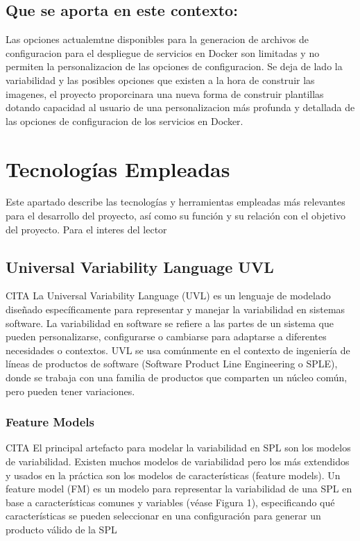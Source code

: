 \documentclass[12pt, a4paper, twoside]{article}
\begin{document}
\subsection{Que se aporta en este contexto:}
Las opciones actualemtne disponibles para la generacion de archivos de configuracion para el despliegue de servicios en Docker son limitadas y no permiten la personalizacion de las opciones de configuracion.
Se deja de lado la variabilidad y las posibles opciones que existen a la hora de construir las imagenes, el proyecto proporcinara una nueva forma de construir plantillas dotando capacidad al usuario de una personalizacion
más profunda y detallada de las opciones de configuracion de los servicios en Docker.
















\section{Tecnologías Empleadas}
Este apartado describe las tecnologías y herramientas empleadas más relevantes para el desarrollo del proyecto, así como su función y su relación con el objetivo del proyecto.
Para el interes del lector 

\subsection{Universal Variability Language UVL}
CITA 
La Universal Variability Language (UVL) es un lenguaje de modelado diseñado específicamente para representar y manejar la variabilidad en sistemas software. 
La variabilidad en software se refiere a las partes de un sistema que pueden personalizarse, configurarse o cambiarse para adaptarse a diferentes necesidades o contextos. 
UVL se usa comúnmente en el contexto de ingeniería de líneas de productos de software (Software Product Line Engineering o SPLE), donde se trabaja con una familia de productos que comparten un núcleo común, pero pueden tener variaciones.

\subsubsection{Feature Models}
CITA 
El principal artefacto para modelar la variabilidad en SPL son los modelos de variabilidad. Existen muchos modelos 
de variabilidad pero los más extendidos y usados en la práctica son los modelos de características (feature models). 
Un feature model (FM) es un modelo para representar la variabilidad de una SPL en base a características comunes y 
variables (véase Figura 1), especificando qué características se pueden seleccionar en una configuración para generar 
un producto válido de la SPL
\end{document}
